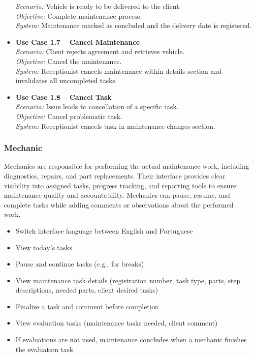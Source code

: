 \begin{itemize}
    \textit{Scenario:} Vehicle is ready to be delivered to the client.\\
    \textit{Objective:} Complete maintenance process.\\
    \textit{System:} Maintenance marked as concluded and the delivery date is registered.
    \item \textbf{Use Case 1.7 – Cancel Maintenance}\\
    \textit{Scenario:} Client rejects agreement and retrieves vehicle.\\
    \textit{Objective:} Cancel the maintenance.\\
    \textit{System:} Receptionist cancels maintenance within details section and invalidates all uncompleted tasks.
    \item \textbf{Use Case 1.8 – Cancel Task}\\
    \textit{Scenario:} Issue leads to cancellation of a specific task.\\
    \textit{Objective:} Cancel problematic task.\\
    \textit{System:} Receptionist cancels task in maintenance changes section.
\end{itemize}


\subsubsection{Mechanic}

Mechanics are responsible for performing the actual maintenance work, including diagnostics, repairs, and part replacements. Their interface provides clear visibility into assigned tasks, progress tracking, and reporting tools to ensure maintenance quality and accountability. Mechanics can pause, resume, and complete tasks while adding comments or observations about the performed work.


\begin{itemize}
    \item Switch interface language between English and Portuguese
    \item View today's tasks
    \item Pause and continue tasks (e.g., for breaks)
    \item View maintenance task details (registration number, task type, parts, step descriptions, needed parts, client desired tasks)
    \item Finalize a task and comment before completion
    \item View evaluation tasks (maintenance tasks needed, client comment)
    \item If evaluations are not used, maintenance concludes when a mechanic finishes the evaluation task
\end{itemize}

